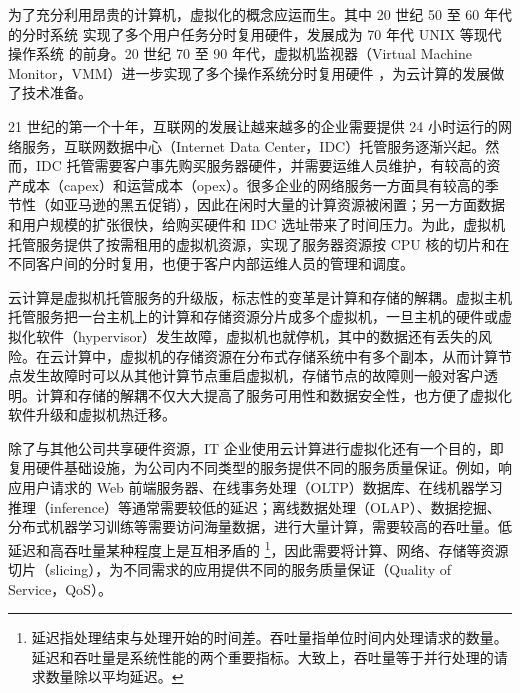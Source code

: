 为了充分利用昂贵的计算机，虚拟化的概念应运而生。其中 20 世纪 50 至 60 年代的分时系统 \cite{strachey1959time,amdahl1964architecture} 实现了多个用户任务分时复用硬件，发展成为 70 年代 UNIX 等现代操作系统 \cite{bach1986design} 的前身。20 世纪 70 至 90 年代，虚拟机监视器（Virtual Machine Monitor，VMM）进一步实现了多个操作系统分时复用硬件 \cite{popek1974formal,agesen2010evolution}，为云计算的发展做了技术准备。


21 世纪的第一个十年，互联网的发展让越来越多的企业需要提供 24 小时运行的网络服务，互联网数据中心（Internet Data Center，IDC）托管服务逐渐兴起。然而，IDC 托管需要客户事先购买服务器硬件，并需要运维人员维护，有较高的资产成本（capex）和运营成本（opex）。很多企业的网络服务一方面具有较高的季节性（如亚马逊的黑五促销），因此在闲时大量的计算资源被闲置；另一方面数据和用户规模的扩张很快，给购买硬件和 IDC 选址带来了时间压力。为此，虚拟机托管服务提供了按需租用的虚拟机资源，实现了服务器资源按 CPU 核的切片和在不同客户间的分时复用，也便于客户内部运维人员的管理和调度。

云计算是虚拟机托管服务的升级版，标志性的变革是计算和存储的解耦。虚拟主机托管服务把一台主机上的计算和存储资源分片成多个虚拟机，一旦主机的硬件或虚拟化软件（hypervisor）发生故障，虚拟机也就停机，其中的数据还有丢失的风险。在云计算中，虚拟机的存储资源在分布式存储系统中有多个副本，从而计算节点发生故障时可以从其他计算节点重启虚拟机，存储节点的故障则一般对客户透明。计算和存储的解耦不仅大大提高了服务可用性和数据安全性，也方便了虚拟化软件升级和虚拟机热迁移。

除了与其他公司共享硬件资源，IT 企业使用云计算进行虚拟化还有一个目的，即复用硬件基础设施，为公司内不同类型的服务提供不同的服务质量保证。例如，响应用户请求的 Web 前端服务器、在线事务处理（OLTP）数据库、在线机器学习推理（inference）等通常需要较低的延迟；离线数据处理（OLAP）、数据挖掘、分布式机器学习训练等需要访问海量数据，进行大量计算，需要较高的吞吐量。低延迟和高吞吐量某种程度上是互相矛盾的  \footnote{延迟指处理结束与处理开始的时间差。吞吐量指单位时间内处理请求的数量。延迟和吞吐量是系统性能的两个重要指标。大致上，吞吐量等于并行处理的请求数量除以平均延迟。}，因此需要将计算、网络、存储等资源切片（slicing），为不同需求的应用提供不同的服务质量保证（Quality of Service，QoS）。


